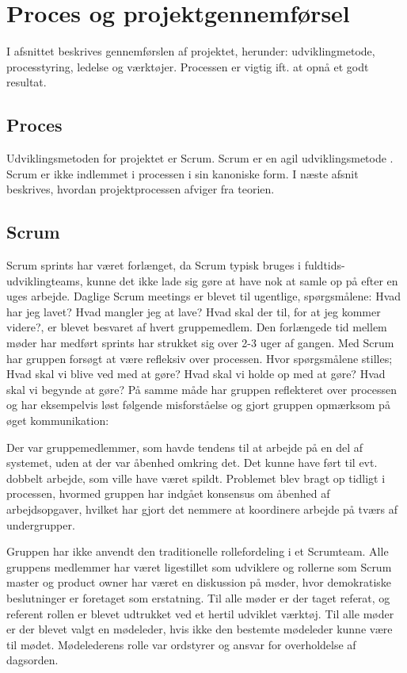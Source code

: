 \chapter{Proces og projektgennemførsel}

I afsnittet beskrives gennemførslen af projektet, herunder: udviklingmetode, processtyring, ledelse og værktøjer. Processen er vigtig ift. at opnå et godt resultat. 

\section{Proces}
Udviklingsmetoden for projektet er Scrum. Scrum er en agil udviklingsmetode \cite[kap. 1]{robertmartin2006}. Scrum er ikke indlemmet i processen i sin kanoniske form. I næste afsnit beskrives, hvordan projektprocessen afviger fra teorien.

\section{Scrum}
Scrum sprints har været forlænget, da Scrum typisk bruges i fuldtids-udviklingteams, kunne det ikke lade sig gøre at have nok at samle op på efter en uges arbejde. Daglige Scrum meetings er blevet til ugentlige, spørgsmålene: Hvad har jeg lavet? Hvad mangler jeg at lave? Hvad skal der til, for at jeg kommer videre?, er blevet besvaret af hvert gruppemedlem. Den forlængede tid mellem møder har medført sprints har strukket sig over 2-3 uger af gangen. Med Scrum har gruppen forsøgt at være refleksiv over processen. Hvor spørgsmålene stilles; Hvad skal vi blive ved med at gøre? Hvad skal vi holde op med at gøre? Hvad skal vi begynde at gøre? På samme måde har gruppen reflekteret over processen og har eksempelvis løst følgende misforståelse og gjort gruppen opmærksom på øget kommunikation:

Der var gruppemedlemmer, som havde tendens til at arbejde på en del af systemet, uden at der var åbenhed omkring det. Det kunne have ført til evt. dobbelt arbejde, som ville have været spildt. Problemet blev bragt op tidligt i processen, hvormed gruppen har indgået konsensus om åbenhed af arbejdsopgaver, hvilket har gjort det nemmere at koordinere arbejde på tværs af undergrupper.

Gruppen har ikke anvendt den traditionelle rollefordeling i et Scrumteam. Alle gruppens medlemmer har været ligestillet som udviklere og rollerne som Scrum master og product owner har været en diskussion på møder, hvor demokratiske beslutninger er foretaget som erstatning. Til alle møder er der taget referat, og referent rollen er blevet udtrukket ved et hertil udviklet værktøj. Til alle møder er der blevet valgt en mødeleder, hvis ikke den bestemte mødeleder kunne være til mødet. Mødelederens rolle var ordstyrer og ansvar for overholdelse af dagsorden. 

